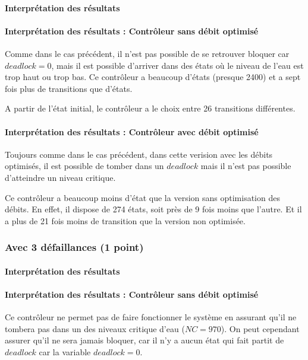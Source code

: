 \documentclass[a4paper]{book}
\begin{document}
\paragraph{Interprétation des résultats}
\paragraph{Interprétation des résultats : Contrôleur sans débit optimisé}
Comme dans le cas précédent, il n'est pas possible de se retrouver bloquer car $deadlock=0$, mais il est possible d'arriver dans des états où le niveau de l'eau est trop haut ou trop bas.
Ce contrôleur a beaucoup d'états (presque 2400) et a sept fois plus de transitions que d'états.

A partir de l'état initial, le contrôleur a le choix entre 26 transitions différentes.
\paragraph{Interprétation des résultats : Contrôleur avec débit optimisé}
Toujours comme dans le cas précédent, dans cette verision avec les débits optimisés, il est possible de tomber dans un $deadlock$ mais il n'est pas possible d'atteindre un niveau critique.

Ce contrôleur a beaucoup moins d'état que la version sans optimisation des débits. En effet, il dispose de 274 états, soit près de 9 fois moins que l'autre.
Et il a plus de 21 fois moins de transition que la version non optimisée.


\subsubsection{Avec 3 défaillances (1 point)}


%
%
%
\paragraph{Interprétation des résultats}
\paragraph{Interprétation des résultats : Contrôleur sans débit optimisé}
Ce contrôleur ne permet pas de faire fonctionner le système en assurant qu'il ne tombera pas dans un des niveaux critique d'eau ($NC = 970$).
On peut cependant assurer qu'il ne sera jamais bloquer, car il n'y a aucun état qui fait partit de $deadlock$ car la variable $deadlock=0$.
\end{document}
